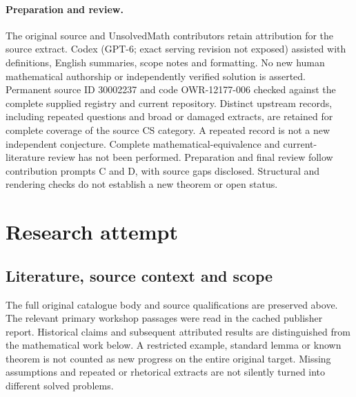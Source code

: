 \documentclass[11pt]{article}
\begin{document}
\paragraph{Preparation and review.}
The original source and UnsolvedMath contributors retain attribution for the source extract. Codex (GPT-6; exact serving revision not exposed) assisted with definitions, English summaries, scope notes and formatting. No new human mathematical authorship or independently verified solution is asserted. Permanent source ID 30002237 and code OWR-12177-006 checked against the complete supplied registry and current repository. Distinct upstream records, including repeated questions and broad or damaged extracts, are retained for complete coverage of the source CS category. A repeated record is not a new independent conjecture. Complete mathematical-equivalence and current-literature review has not been performed. Preparation and final review follow contribution prompts C and D, with source gaps disclosed. Structural and rendering checks do not establish a new theorem or open status.
\label{end:30002237}

\section{Research attempt}
\subsection{Literature, source context and scope}
The full original catalogue body and source qualifications are preserved above. The relevant primary workshop passages were read in the cached publisher report. Historical claims and subsequent attributed results are distinguished from the mathematical work below. A restricted example, standard lemma or known theorem is not counted as new progress on the entire original target. Missing assumptions and repeated or rhetorical extracts are not silently turned into different solved problems.
\end{document}

